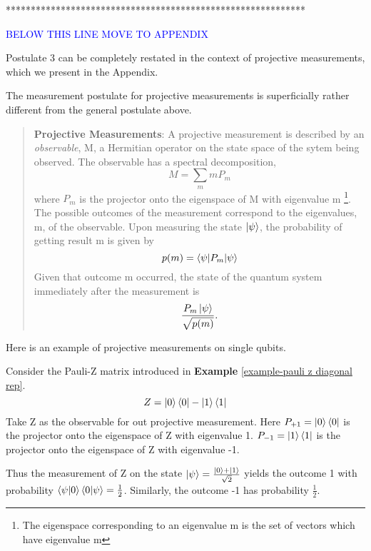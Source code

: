 { 
 
 
 
 ************************************************************
 
 \textcolor{blue}{BELOW THIS LINE MOVE TO APPENDIX}

Postulate 3 can be completely restated in the context of projective measurements, which we present in the Appendix.




The measurement postulate for projective measurements is superficially rather different from the general postulate above.
\begin{quote}
    \textbf{Projective Measurements}: A projective measurement is described by an \textit{observable}, M, a Hermitian operator on the state space of the sytem being observed. The observable has a spectral decomposition,
    \begin{equation}
        M=\sum_m m P_m
    \end{equation}
    where $P_m$ is the projector onto the eigenspace of M with eigenvalue m \footnote{The eigenspace corresponding to an eigenvalue m is the set of vectors which have eigenvalue m}. The possible outcomes of the measurement correspond to the eigenvalues, m, of the observable. Upon measuring the state $\ket{\psi}$, the probability of getting result m is given by 
    \begin{equation}
        p(m)=\braket{\psi|P_m|\psi}
    \end{equation}
    Given that outcome m occurred, the state of the quantum system immediately after the measurement is 
    \begin{equation}
        \frac{P_m \ket{\psi}}{\sqrt{p(m)}}.
    \end{equation}
\end{quote}

Here is an example of projective measurements on single qubits.
\begin{example}
Consider the Pauli-Z matrix introduced in \textbf{Example} \ref{example-pauli z diagonal rep}.
\begin{equation}
    Z=\ket{0}\bra{0}-\ket{1}\bra{1}
\end{equation}
Take Z as the observable for out projective measurement. Here $P_{+1}=\ket{0}\bra{0}$ is the projector onto the eigenspace of Z with eigenvalue 1. $P_{-1}=\ket{1}\bra{1}$ is the projector onto the eigenspace of Z with eigenvalue -1.

Thus the measurement of Z on the state $\ket{\psi}=\frac{\ket{0}+\ket{1}}{\sqrt{2}}$ yields the outcome 1 with probability $\braket{\psi|0}\braket{0|\psi}=\frac{1}{2}$. Similarly, the outcome -1 has probability $\frac{1}{2}$.
\end{example}

}
